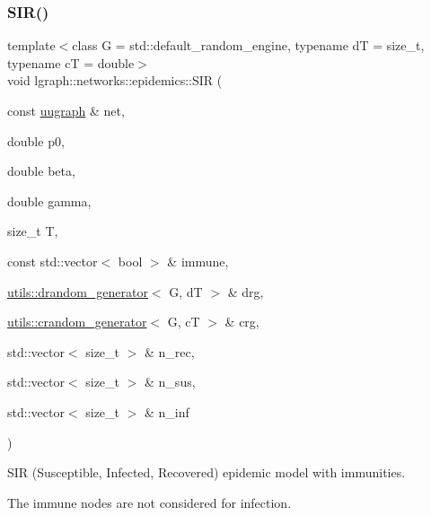 \subsubsection{\texorpdfstring{S\+I\+R()}{SIR()}\hspace{0.1cm}{\footnotesize\ttfamily [2/2]}}
{\footnotesize\ttfamily template$<$class G  = std\+::default\+\_\+random\+\_\+engine, typename dT  = size\+\_\+t, typename cT  = double$>$ \\
void lgraph\+::networks\+::epidemics\+::\+S\+IR (\begin{DoxyParamCaption}\item[{const \hyperlink{classlgraph_1_1uugraph}{uugraph} \&}]{net,  }\item[{double}]{p0,  }\item[{double}]{beta,  }\item[{double}]{gamma,  }\item[{size\+\_\+t}]{T,  }\item[{const std\+::vector$<$ bool $>$ \&}]{immune,  }\item[{\hyperlink{classlgraph_1_1utils_1_1drandom__generator}{utils\+::drandom\+\_\+generator}$<$ G, dT $>$ \&}]{drg,  }\item[{\hyperlink{classlgraph_1_1utils_1_1crandom__generator}{utils\+::crandom\+\_\+generator}$<$ G, cT $>$ \&}]{crg,  }\item[{std\+::vector$<$ size\+\_\+t $>$ \&}]{n\+\_\+rec,  }\item[{std\+::vector$<$ size\+\_\+t $>$ \&}]{n\+\_\+sus,  }\item[{std\+::vector$<$ size\+\_\+t $>$ \&}]{n\+\_\+inf }\end{DoxyParamCaption})}



S\+IR (Susceptible, Infected, Recovered) epidemic model with immunities. 

The immune nodes are not considered for infection.


